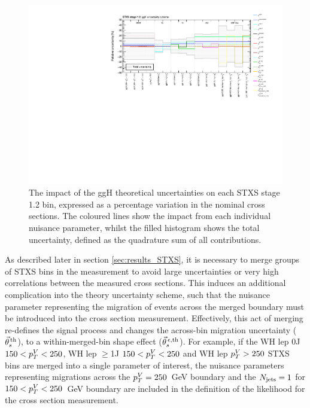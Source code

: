 \begin{figure}[htb]
  \centering
  \includegraphics[width=1\textwidth]{Figures/hgg_stats/ggH_NPScheme.pdf}
  \caption[STXS stage 1.2 ggH uncertainty scheme]
  {
    The impact of the ggH theoretical uncertainties on each STXS stage 1.2 bin, expressed as a percentage variation in the nominal cross sections. The coloured lines show the impact from each individual nuisance parameter, whilst the filled histogram shows the total uncertainty, defined as the quadrature sum of all contributions.
  }
  \label{fig:ggH_uncertainty_scheme}
\end{figure}

As described later in section \ref{sec:results_STXS}, it is necessary to merge groups of STXS bins in the measurement to avoid large uncertainties or very high correlations between the measured cross sections. This induces an additional complication into the theory uncertainty scheme, such that the nuisance parameter representing the migration of events across the merged boundary must be introduced into the cross section measurement. Effectively, this act of merging re-defines the signal process and changes the across-bin migration uncertainty ($\vec{\theta}^{\,\rm{th}}_{s}$), to a within-merged-bin shape effect ($\vec{\theta}^{\,\epsilon,{\rm{th}}}_{s}$). For example, if the WH lep 0J $150<p_T^V<250$, WH lep $\geq$1J $150<p_T^V<250$ and WH lep $p_T^V>250$ STXS bins are merged into a single parameter of interest, the nuisance parameters representing migrations across the $p_T^V=250$~GeV boundary and the $N_{\rm{jets}}=1$ for $150<p_T^V<250$~GeV boundary are included in the definition of the likelihood for the cross section measurement.

